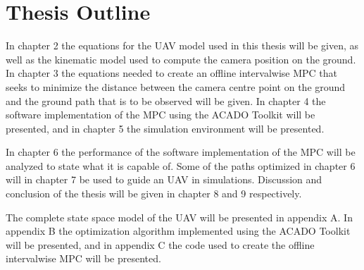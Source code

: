 \section{Thesis Outline}

In chapter 2 the equations for the UAV model used in this thesis will be given, as well as the kinematic model used to compute the camera position on the ground. In chapter 3 the equations needed to create an offline intervalwise MPC that seeks to minimize the distance between the camera centre point on the ground and the ground path that is to be observed will be given. In chapter 4 the software implementation of the MPC using the ACADO Toolkit will be presented, and in chapter 5 the simulation environment will be presented.

In chapter 6 the performance of the software implementation of the MPC will be analyzed to state what it is capable of. Some of the paths optimized in chapter 6 will in chapter 7 be used to guide an UAV in simulations. Discussion and conclusion of the thesis will be given in chapter 8 and 9 respectively.

The complete state space model of the UAV will be presented in appendix A. In appendix B the optimization algorithm implemented using the ACADO Toolkit will be presented, and in appendix C the code used to create the offline intervalwise MPC will be presented.
